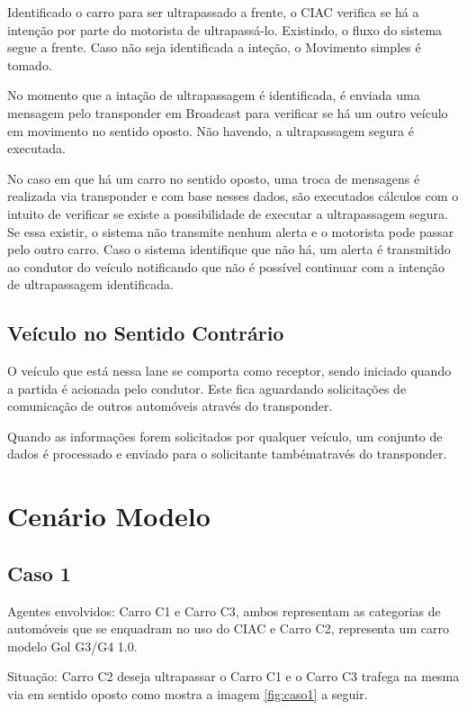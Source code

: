 Identificado o carro para ser ultrapassado a frente, o CIAC verifica se há a
intenção por parte do motorista de ultrapassá-lo. Existindo, o fluxo do sistema
segue a frente. Caso não seja identificada a inteção, o Movimento simples
é tomado.

No momento que a intação de ultrapassagem é identificada, é enviada uma mensagem
pelo transponder em Broadcast para verificar se há um outro veículo em movimento
no sentido oposto. Não havendo, a ultrapassagem segura é executada.

No caso em que há um carro no sentido oposto, uma troca de mensagens é realizada
via transponder e com base nesses dados, são executados cálculos com o intuito
de verificar se existe a possibilidade de executar a ultrapassagem segura.
Se essa existir, o sistema não transmite nenhum alerta e o motorista pode passar
pelo outro carro. Caso o sistema identifique que não há, um alerta é transmitido
ao condutor do veículo notificando que não é possível continuar com a intenção
de ultrapassagem identificada.

\subsection{Veículo no Sentido Contrário}

O veículo que está nessa lane se comporta como receptor, sendo iniciado quando
a partida é acionada pelo condutor. Este fica aguardando solicitações de
comunicação de outros automóveis através do transponder.

Quando as informações forem
solicitados por qualquer veículo, um conjunto de dados é processado e enviado
para o solicitante tambématravés do transponder.

\section{Cenário Modelo}

\subsection{Caso 1}

Agentes envolvidos: Carro C1 e Carro C3, ambos representam as categorias de
automóveis que se enquadram no uso do CIAC e Carro C2, representa um carro
modelo Gol G3/G4 1.0.

Situação: Carro C2 deseja ultrapassar o Carro C1 e o Carro C3 trafega na mesma
via em sentido oposto como mostra a imagem \ref{fig:caso1} a seguir.


